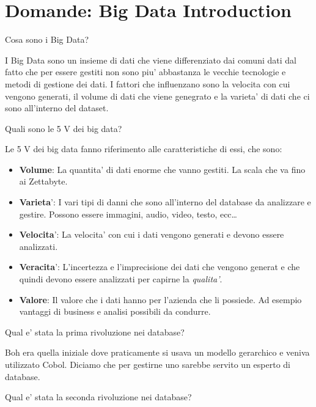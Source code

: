 \section{Domande: Big Data Introduction}
\begin{domanda}
    Cosa sono i Big Data?
\end{domanda}
I Big Data sono un insieme di dati che viene differenziato dai comuni dati
dal fatto che per essere gestiti non sono piu' abbastanza le vecchie
tecnologie e metodi di gestione dei dati. I fattori che influenzano sono la velocita con cui
vengono generati, il volume di dati che viene genegrato e la varieta' di dati
che ci sono all'interno del dataset.

\begin{domanda}
    Quali sono le 5 V dei big data?
\end{domanda}

Le 5 V dei big data fanno riferimento alle caratteristiche di essi, che sono:
\begin{itemize}
    \item \textbf{Volume}: La quantita' di dati enorme che vanno gestiti. La scala che va fino ai
          Zettabyte.
    \item \textbf{Varieta}': I vari tipi di danni che sono all'interno del database da analizzare e gestire. Possono essere immagini, audio, video, testo, ecc\dots
    \item \textbf{Velocita}': La velocita' con cui i dati vengono generati e devono essere analizzati.
    \item \textbf{Veracita}': L'incertezza e l'imprecisione dei dati che vengono generat e che quindi devono essere analizzati per capirne la \textit{qualita'}.
    \item \textbf{Valore}: Il valore che i dati hanno per l'azienda che li possiede. Ad esempio vantaggi di business e analisi possibili da condurre.
\end{itemize}

\begin{domanda}
    Qual e' stata la prima rivoluzione nei database?
\end{domanda}

Boh era quella iniziale dove praticamente si usava un modello gerarchico e veniva utilizzato Cobol.
Diciamo che per gestirne uno sarebbe servito un esperto di database.

\begin{domanda}
    Qual e' stata la seconda rivoluzione nei database?
\end{domanda}

